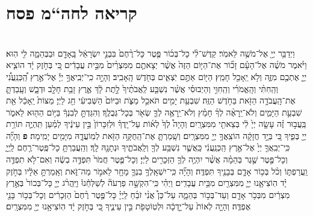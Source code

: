 \documentclass[twoside, openany, parskip=half, 11pt]{book}
\begin{document}
\begin{footnotesize}
\begin{multicols}{2}
\end{multicols}

\section[חה“מ פסח]{קריאה לחה“מ פסח}

\begin{multicols}{2}

\\
וַיְדַבֵּ֥ר יְיָ֖ אֶל־מֹשֶׁ֥ה לֵּאמֹֽר׃ קַדֶּשׁ־לִ֨י כָל־בְּכ֜וֹר פֶּ֤טֶר כָּל־רֶ֨חֶם֙ בִּבְנֵ֣י יִשְׂרָאֵ֔ל בָּֽאָדָ֖ם וּבַבְּהֵמָ֑ה לִ֖י הֽוּא׃ וַיֹּ֨אמֶר מֹשֶׁ֜ה אֶל־הָעָ֗ם זָכ֞וֹר אֶת־הַיּ֤וֹם הַזֶּה֙ אֲשֶׁ֨ר יְצָאתֶ֤ם מִמִּצְרַ֨יִם֙ מִבֵּ֣ית עֲבָדִ֔ים כִּ֚י בְּחֹ֣זֶק יָ֔ד הוֹצִ֧יא יְיָ֛ אֶתְכֶ֖ם מִזֶּ֑ה וְלֹ֥א יֵֽאָכֵ֖ל חָמֵֽץ׃ הַיּ֖וֹם אַתֶּ֣ם יֹֽצְאִ֑ים בְּחֹ֖דֶשׁ הָֽאָבִֽיב׃
 וְהָיָ֣ה כִֽי־יְבִֽיאֲךָ֣ יְיָ֡ אֶל־אֶ֣רֶץ הַֽ֠כְּנַֽעֲנִ֠י וְהַֽחִתִּ֨י וְהָֽאֱמֹרִ֜י וְהַֽחִוִּ֣י וְהַיְבוּסִ֗י אֲשֶׁ֨ר נִשְׁבַּ֤ע לַֽאֲבֹתֶ֨יךָ֙ לָ֣תֶת לָ֔ךְ אֶ֛רֶץ זָבַ֥ת חָלָ֖ב וּדְבָ֑שׁ וְעָֽבַדְתָּ֛ אֶת־הָֽעֲבֹדָ֥ה הַזֹּ֖את בַּחֹ֥דֶשׁ הַזֶּֽה׃ שִׁבְעַ֥ת יָמִ֖ים תֹּאכַ֣ל מַצֹּ֑ת וּבַיּוֹם֙ הַשְּׁבִיעִ֔י חַ֖ג לַיְיָ׃ מַצּוֹת֙ יֵֽאָכֵ֔ל אֵ֖ת שִׁבְעַ֣ת הַיָּמִ֑ים וְלֹא־יֵֽרָאֶ֨ה לְךָ֜ חָמֵ֗ץ וְלֹא־יֵֽרָאֶ֥ה לְךָ֛ שְׂאֹ֖ר בְּכָל־גְּבֻלֶֽךָ׃ וְהִגַּדְתָּ֣ לְבִנְךָ֔ בַּיּ֥וֹם הַה֖וּא לֵאמֹ֑ר בַּֽעֲב֣וּר זֶ֗ה עָשָׂ֤ה יְיָ֙ לִ֔י בְּצֵאתִ֖י מִמִּצְרָֽיִם׃ וְהָיָה֩ לְךָ֙ לְא֜וֹת עַל־יָֽדְךָ֗ וּלְזִכָּרוֹן֙ בֵּ֣ין עֵינֶ֔יךָ לְמַ֗עַן תִּֽהְיֶ֛ה תּוֹרַ֥ת יְיָ֖ בְּפִ֑יךָ כִּ֚י בְּיָ֣ד חֲזָקָ֔ה הוֹצִֽאֲךָ֥ יְיָ֖ מִמִּצְרָֽיִם׃ וְשָֽׁמַרְתָּ֛ אֶת־הַֽחֻקָּ֥ה הַזֹּ֖את לְמֽוֹעֲדָ֑הּ מִיָּמִ֖ים יָמִֽימָה׃ \textbf{פ} 
וְהָיָ֞ה כִּֽי־יְבִֽאֲךָ֤ יְיָ֙ אֶל־אֶ֣רֶץ הַֽכְּנַֽעֲנִ֔י כַּֽאֲשֶׁ֛ר נִשְׁבַּ֥ע לְךָ֖ וְלַֽאֲבֹתֶ֑יךָ וּנְתָנָ֖הּ לָֽךְ׃ וְהַֽעֲבַרְתָּ֥ כָל־פֶּֽטֶר־רֶ֖חֶם לַֽיְיָ֑ וְכָל־פֶּ֣טֶר שֶׁ֣גֶר בְּהֵמָ֗ה אֲשֶׁ֨ר יִהְיֶ֥ה לְךָ֛ הַזְּכָרִ֖ים לַיְיָ׃ וְכָל־פֶּ֤טֶר חֲמֹר֙ תִּפְדֶּ֣ה בְשֶׂ֔ה וְאִם־לֹ֥א תִפְדֶּ֖ה וַֽעֲרַפְתּ֑וֹ וְכֹ֨ל בְּכ֥וֹר אָדָ֛ם בְּבָנֶ֖יךָ תִּפְדֶּֽה׃ וְהָיָ֞ה כִּֽי־יִשְׁאָֽלְךָ֥ בִנְךָ֛ מָחָ֖ר לֵאמֹ֣ר מַה־זֹּ֑את וְאָֽמַרְתָּ֣ אֵלָ֔יו בְּחֹ֣זֶק יָ֗ד הֽוֹצִיאָ֧נוּ יְיָ֛ מִמִּצְרַ֖יִם מִבֵּ֥ית עֲבָדִֽים׃ וַיְהִ֗י כִּֽי־הִקְשָׁ֣ה פַרְעֹה֘ לְשַׁלְּחֵ֒נוּ֒ וַיַּֽהֲרֹ֨ג יְיָ֤ כָּל־בְּכוֹר֙ בְּאֶ֣רֶץ מִצְרַ֔יִם מִבְּכֹ֥ר אָדָ֖ם וְעַד־בְּכ֣וֹר בְּהֵמָ֑ה עַל־כֵּן֩ אֲנִ֨י זֹבֵ֜חַ לַֽיְיָ֗ כָּל־פֶּ֤טֶר רֶ֨חֶם֙ הַזְּכָרִ֔ים וְכָל־בְּכ֥וֹר בָּנַ֖י אֶפְדֶּֽה׃ וְהָיָ֤ה לְאוֹת֙ עַל־יָ֣דְכָ֔ה וּלְטֽוֹטָפֹ֖ת בֵּ֣ין עֵינֶ֑יךָ כִּ֚י בְּחֹ֣זֶק יָ֔ד הֽוֹצִיאָ֥נוּ יְיָ֖ מִמִּצְרָֽיִם׃


\end{multicols}
\end{footnotesize}
\end{document}
